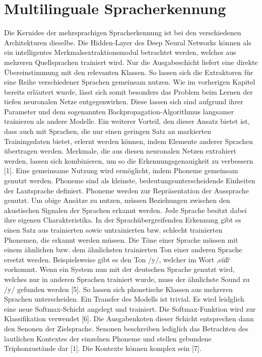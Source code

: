 \section{Multilinguale Spracherkennung}
Die Kernidee der mehrsprachigen Spracherkennung ist bei den verschiedenen Architekturen dieselbe. Die Hidden-Layer des Deep Neural Networks können als ein intelligentes Merkmalsextraktionsmodul betrachtet werden, welches aus mehreren Quellsprachen trainiert wird. Nur die Ausgabeschicht liefert eine direkte Übereinstimmung mit den relevanten Klassen. So lassen sich die Extraktoren für eine Reihe verschiedener Sprachen gemeinsam nutzen. Wie im vorherigen Kapitel bereits erläutert wurde, lässt sich somit besonders das Problem beim Lernen der tiefen neuronalen Netze entgegenwirken. Diese lassen sich sind aufgrund ihrer Parameter und dem sogenannten Backpropagation-Algorithmus langsamer trainieren als andere Modelle. Ein weiterer Vorteil, den dieser Ansatz bietet ist, dass auch mit Sprachen, die nur einen geringen Satz an markierten Trainingsdaten bietet, erlernt werden können, indem Elemente anderer Sprachen übertragen werden. Merkmale, die aus diesen neuronalen Netzen extrahiert werden, lassen sich kombinieren, um so die Erkennungsgenauigkeit zu verbessern [1]. 
Eine gemeinsame Nutzung wird ermöglicht, indem Phoneme gemeinsam genutzt werden. Phoneme sind als kleinste, bedeutungsunterscheidende Einheiten der Lautsprache definiert. Phoneme werden zur Repräsentation der Aussprache genutzt. Um obige Ansätze zu nutzen, müssen Beziehungen zwischen den akustischen Signalen der Sprachen erkannt werden. Jede Sprache besitzt dabei ihre eigenen Charakteristika. In der Sprachübergreifenden Erkennung gibt es einen Satz aus trainierten sowie untrainierten bzw. schlecht trainierten Phonemen, die erkannt werden müssen. Die Töne einer Sprache müssen mit einem ähnlichen bzw. dem ähnlichsten trainierten Ton einer anderen Sprache ersetzt werden. Beispielsweise gibt es den Ton /y/, welcher im Wort ‚süß‘ vorkommt. Wenn ein System nun mit der deutschen Sprache genutzt wird, welches nur in anderen Sprachen trainiert wurde, muss der ähnlichste Sound zu /y/ gefunden werden [5]. So lassen sich phonetische Klassen aus mehreren Sprachen unterscheiden. Ein Transfer des Modells ist trivial. Es wird leidglich eine neue Softmax-Schicht angelegt und trainiert. Die Softmax-Funktion wird zur Klassifikation verwendet [6]. Die Ausgabenkoten dieser Schicht entsprechen dann den Senonen der Zielsprache. Senonen beschreiben lediglich das Betrachten des lautlichen Kontextes der einzelnen Phoneme und stellen gebundene Triphonzustände dar [1]. Die Kontexte können komplex sein [7]. 
